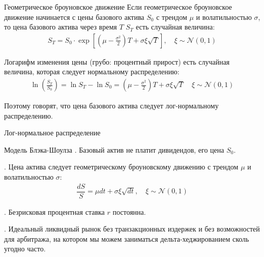 \documentclass{beamer}
\begin{document}
\begin{frame}{Геометрическое броуновское движение}
\justify
Если геометрическое броуновское движение начинается с цены базового актива $S_0$ с трендом $\mu$ и волатильностью $\sigma$, то цена базового актива через время $T$ $S_T$ есть случайная величина:
\begin{align*}
S_T = S_0\cdot \exp\left[\left(\mu - \frac{\sigma^2}{2}\right)T + \sigma\xi\sqrt{T}\right], \quad \xi \sim \mathcal{N}(0, 1)
\end{align*} 

\justify
Логарифм изменения цены (грубо: процентный прирост) есть случайная величина, которая следует нормальному распределению:
\begin{align*}
\ln\left(\frac{S_T}{S_0}\right) = \ln S_T - \ln S_0 = \left(\mu - \frac{\sigma^2}{2}\right)T + \sigma\xi\sqrt{T} \quad \xi \sim \mathcal{N}(0, 1)
\end{align*}

\justify
Поэтому говорят, что цена базового актива следует лог-нормальному распределению.
\end{frame}



\begin{frame}{Лог-нормальное распределение}
\centering
{}
\end{frame}



\begin{frame}{Модель Блэка-Шоулза}
. Базовый актив не платит дивидендов, его цена $S_0$.

. Цена актива следует геометрическому броуновскому движению с трендом $\mu$ и волатильностью $\sigma$:
\begin{align*}
\dfrac{dS}{S} = \mu dt + \sigma\xi\sqrt{dt}, \quad \xi \sim \mathcal{N}(0,1)
\end{align*}

. Безрисковая процентная ставка $r$ постоянна.

. Идеальный ликвидный рынок без транзакционных издержек и без возможностей для арбитража, на котором мы можем заниматься дельта-хеджированием сколь угодно часто.
\end{frame}
\end{document}
